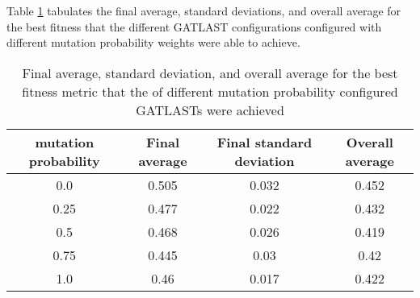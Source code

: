 Table \ref{tab:HP:GA:mutationProp:best fitness} tabulates the final average, standard deviations, and overall average for the best fitness that the different GATLAST configurations configured with different mutation probability weights were able to achieve.
\begin{table}[tbh!]
\centering
\begin{adjustbox}{trim=0cm 0cm 0cm 0cm, clip=true}
\begin{tabular}{|c|c|c|c|}
\hline
mutation probability & Final average & Final standard deviation & Overall average\\
\hline
0.0 & 0.505 & 0.032 & 0.452\\\hline
0.25 & 0.477 & 0.022 & 0.432\\\hline
0.5 & 0.468 & 0.026 & 0.419\\\hline
0.75 & 0.445 & 0.03 & 0.42\\\hline
1.0 & 0.46 & 0.017 & 0.422\\\hline
\end{tabular}
\end{adjustbox}
\caption{Final average, standard deviation, and overall average for the best fitness metric that the of different mutation probability configured GATLASTs were achieved}
\label{tab:HP:GA:mutationProp:best fitness}
\end{table}